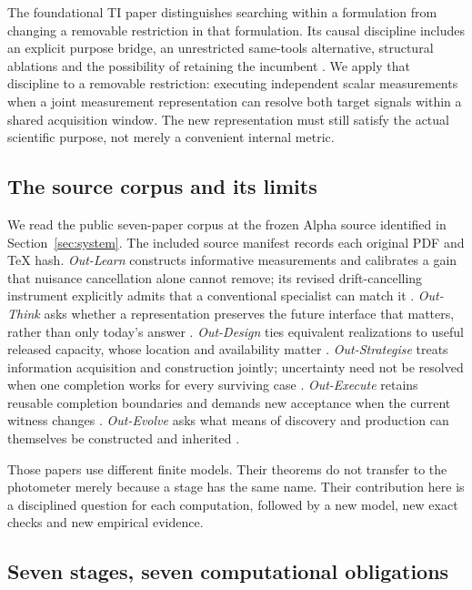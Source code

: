 \documentclass[11pt]{article}
\begin{document}
The foundational TI paper distinguishes searching within a formulation from changing a removable restriction in that formulation. Its causal discipline includes an explicit purpose bridge, an unrestricted same-tools alternative, structural ablations and the possibility of retaining the incumbent \cite{ti}. We apply that discipline to a removable restriction: executing independent scalar measurements when a joint measurement representation can resolve both target signals within a shared acquisition window. The new representation must still satisfy the actual scientific purpose, not merely a convenient internal metric.

\subsection{The source corpus and its limits}

We read the public seven-paper corpus at the frozen Alpha source identified in Section~\ref{sec:system}. The included source manifest records each original PDF and TeX hash. \emph{Out-Learn} constructs informative measurements and calibrates a gain that nuisance cancellation alone cannot remove; its revised drift-cancelling instrument explicitly admits that a conventional specialist can match it \cite{outlearn}. \emph{Out-Think} asks whether a representation preserves the future interface that matters, rather than only today's answer \cite{outthink}. \emph{Out-Design} ties equivalent realizations to useful released capacity, whose location and availability matter \cite{outdesign}. \emph{Out-Strategise} treats information acquisition and construction jointly; uncertainty need not be resolved when one completion works for every surviving case \cite{outstrategise}. \emph{Out-Execute} retains reusable completion boundaries and demands new acceptance when the current witness changes \cite{outexecute}. \emph{Out-Evolve} asks what means of discovery and production can themselves be constructed and inherited \cite{outevolve}.

Those papers use different finite models. Their theorems do not transfer to the photometer merely because a stage has the same name. Their contribution here is a disciplined question for each computation, followed by a new model, new exact checks and new empirical evidence.

\subsection{Seven stages, seven computational obligations}
\end{document}

